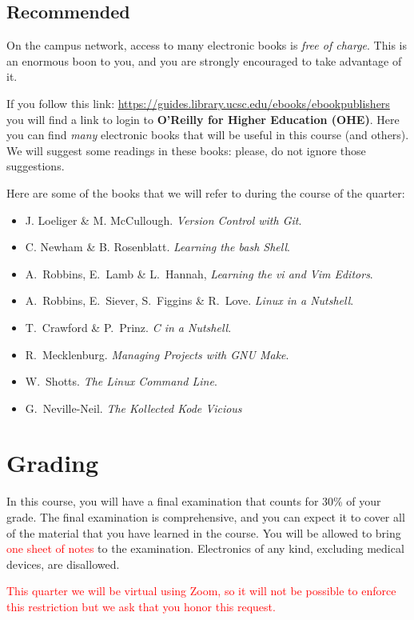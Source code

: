 \documentclass{article}
\begin{document}
\subsection{Recommended}

On the campus network, access to many electronic books is \emph{free of
charge}. This is an enormous boon to you, and you are strongly
encouraged to take advantage of it.

If you follow this link:
\url{https://guides.library.ucsc.edu/ebooks/ebookpublishers} you will
find a link to login to \textbf{O'Reilly for Higher Education (OHE)}.
Here you can find \emph{many} electronic books that will be useful in
this course (and others). We will suggest some readings in these books:
please, do not ignore those suggestions.

Here are some of the books that we will refer to during the course of the
quarter:
\begin{itemize}
  \item J.\xspace Loeliger \& M.\xspace McCullough. \emph{Version Control with
    Git}.
  \item C.\xspace Newham \& B.\xspace Rosenblatt. \emph{Learning the bash
    Shell}.
  \item A.\ Robbins, E.\ Lamb \& L.\ Hannah, \emph{Learning the vi and Vim
    Editors}.
  \item A.\ Robbins, E.\ Siever, S.\ Figgins \& R.\ Love. \emph{Linux in a
    Nutshell}.
  \item T.\ Crawford \& P.\ Prinz. \emph{C in a Nutshell}.
  \item R.\ Mecklenburg. \emph{Managing Projects with GNU Make}.
  \item W.\ Shotts. \emph{The Linux Command Line}.
  \item G.\ Neville-Neil. \emph{The Kollected Kode Vicious}
\end{itemize}

\section{Grading}

In this course, you will have a final examination that counts for 30\%
of your grade. The final examination is comprehensive, and you can
expect it to cover all of the material that you have learned in the
course. You will be allowed to bring \textcolor{red}{one sheet of notes}
to the examination. Electronics of any kind, excluding medical devices,
are disallowed.

\textcolor{red}{This quarter we will be virtual using Zoom, so it will
not be possible to enforce this restriction but we ask that you honor
this request.}
\end{document}
